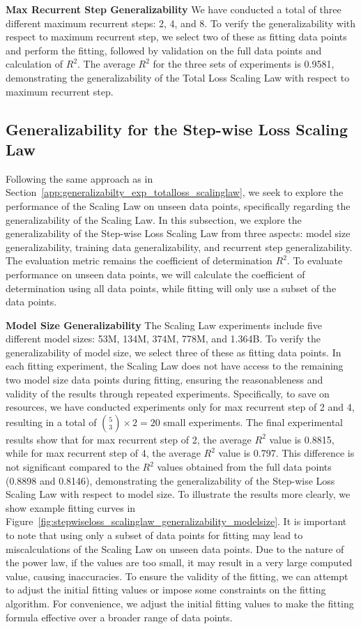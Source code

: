 \documentclass[]{bytedance_seed}
\newcommand{\1}{\mathbf{1}}
\begin{document}
{\textbf{Max Recurrent Step Generalizability} We have conducted a total of three different maximum recurrent steps: 2, 4, and 8. To verify the generalizability with respect to maximum recurrent step, we select two of these as fitting data points and perform the fitting, followed by validation on the full data points and calculation of $R^2$. The average $R^2$ for the three sets of experiments is 0.9581, demonstrating the generalizability of the Total Loss Scaling Law with respect to maximum recurrent step.

\subsection{Generalizability for the Step-wise Loss Scaling Law}
\label{app:generalizabilty_exp_stepwiseloss_scalinglaw}

Following the same approach as in Section~\ref{app:generalizabilty_exp_totalloss_scalinglaw}, we seek to explore the performance of the Scaling Law on unseen data points, specifically regarding the generalizability of the Scaling Law. In this subsection, we explore the generalizability of the Step-wise Loss Scaling Law from three aspects: model size generalizability, training data generalizability, and recurrent step generalizability. The evaluation metric remains the coefficient of determination $R^2$. To evaluate performance on unseen data points, we will calculate the coefficient of determination using all data points, while fitting will only use a subset of the data points.

\textbf{Model Size Generalizability} 
The Scaling Law experiments include five different model sizes: 53M, 134M, 374M, 778M, and 1.364B. To verify the generalizability of model size, we select three of these as fitting data points. In each fitting experiment, the Scaling Law does not have access to the remaining two model size data points during fitting, ensuring the reasonableness and validity of the results through repeated experiments. 
Specifically, to save on resources, we have conducted experiments only for max recurrent step of 2 and 4, resulting in a total of $\binom{5}{3} \times 2 = 20$ small experiments.
The final experimental results show that for max recurrent step of 2, the average $R^2$ value is 0.8815, while for max recurrent step of 4, the average $R^2$ value is 0.797.
This difference is not significant compared to the $R^2$ values obtained from the full data points (0.8898 and 0.8146), demonstrating the generalizability of the Step-wise Loss Scaling Law with respect to model size. To illustrate the results more clearly, we show example fitting curves in Figure~\ref{fig:stepwiseloss_scalinglaw_generalizability_modelsize}. It is important to note that using only a subset of data points for fitting may lead to miscalculations of the Scaling Law on unseen data points. Due to the nature of the power law, if the values are too small, it may result in a very large computed value, causing inaccuracies. To ensure the validity of the fitting, we can attempt to adjust the initial fitting values or impose some constraints on the fitting algorithm. For convenience, we adjust the initial fitting values to make the fitting formula effective over a broader range of data points.

}
\end{document}
